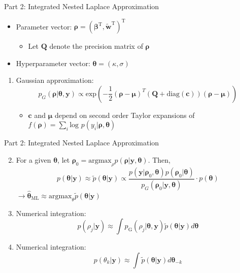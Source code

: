 \documentclass{beamer}
\begin{document}
\begin{frame}{Part 2: Integrated Nested Laplace Approximation} {\citep{Rue2009}}
\begin{itemize}
\addtolength{\itemsep}{0.5\baselineskip}
\item Parameter vector: $\pmb{\rho} = ( \pmb{\beta}^{\text{T}}, \widetilde{\pmb{w}}^{\text{T}} )^{\text{T}}$
            \begin{itemize}
            \addtolength{\itemsep}{0.5\baselineskip}
            \item Let $\pmb{Q}$ denote the precision matrix of $\pmb{\rho}$
            \end{itemize}
\item Hyperparameter vector: $\pmb{\theta} = (\kappa, \sigma )$
\end{itemize}

\begin{enumerate}

\item Gaussian approximation:
$$ p_{G}(\pmb{\rho}|\pmb{\theta}, \pmb{y}) \propto \text{exp} \left( -\frac{1}{2}(\pmb{\rho-\mu})^{T} (\pmb{Q} + \text{diag}(\pmb{c}) ) (\pmb{\rho - \mu}) \right) $$
              \begin{itemize}
              \item $\pmb{c}$ and $\pmb{\mu}$ depend on second order Taylor expansions of $f(\pmb{\rho}) = \sum_{i} \text{log }p(y_{i}|\pmb{\rho},\pmb{\theta})$
              \end{itemize}
\end{enumerate}
\end{frame}


\begin{frame}{Part 2: Integrated Nested Laplace Approximation} {\citep{Rue2009}}
\begin{enumerate}
\setcounter{enumi}{1}
\addtolength{\itemsep}{0.5\baselineskip}
\item For a given $\pmb{\theta}$, let $\pmb{\rho}_{0} = \text{argmax}_{\rho}p(\pmb{\rho}|\pmb{y},\pmb{\theta})$. Then,
$$  p(\pmb{\theta}|\pmb{y}) \approx \tilde{p}(\pmb{\theta}|\pmb{y}) \propto  \frac{p(\pmb{y} | \pmb{\rho}_{0}, \pmb{\theta}) p(\pmb{\rho}_{0} | \pmb{\theta})}{p_{G}(\pmb{\rho}_{0} | \pmb{y}, \pmb{\theta})} \cdot p(\pmb{\theta}) $$
$\longrightarrow \hat{\pmb{\theta}}_{\text{ML}} \approx \text{argmax}_{\theta} \tilde{p}(\pmb{\theta}|\pmb{y})$
\item Numerical integration:
        $$ p(\rho_{j} | \pmb{y}) \approx \int p_{\text{G}}(\rho_{j}|\pmb{\theta, y})\tilde{p}(\pmb{\theta}|\pmb{y}) d\pmb{\theta} $$
\item Numerical integration:
$$ p(\theta_{k} | \pmb{y}) \approx \int \tilde{p}(\pmb{\theta}|\pmb{y}) d\pmb{\theta}_{-k} $$
\end{enumerate}

\end{frame}
\end{document}
